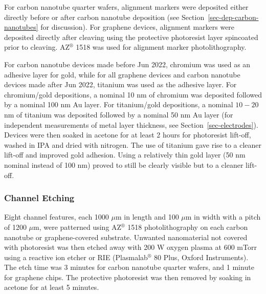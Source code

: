 \documentclass[
  letterpaper,
  DIV=11,
  numbers=noendperiod]{scrartcl}
\begin{document}
For carbon nanotube quarter wafers, alignment markers were deposited
either directly before or after carbon nanotube deposition (see
Section~\ref{sec-dep-carbon-nanotubes} for discussion). For graphene
devices, alignment markers were deposited directly after cleaving using
the protective photoresist layer spincoated prior to cleaving.
AZ\(^\circledR\) 1518 was used for alignment marker photolithography.

For carbon nanotube devices made before Jun 2022, chromium was used as
an adhesive layer for gold, while for all graphene devices and carbon
nanotube devices made after Jun 2022, titanium was used as the adhesive
layer. For chromium/gold depositions, a nominal 10 nm of chromium was
deposited followed by a nominal 100 nm Au layer. For titanium/gold
depositions, a nominal \(10-20\) nm of titanium was deposited followed
by a nominal 50 nm Au layer (for independent measurements of metal layer
thickness, see Section~\ref{sec-electrodes}). Devices were then soaked
in acetone for at least 2 hours for photoresist lift-off, washed in IPA
and dried with nitrogen. The use of titanium gave rise to a cleaner
lift-off and improved gold adhesion. Using a relatively thin gold layer
(50 nm nominal instead of 100 nm) proved to still be clearly visible but
to a cleaner lift-off.

\hypertarget{channel-etching}{%
\subsubsection{Channel Etching}\label{channel-etching}}

Eight channel features, each 1000 \(\mu\)m in length and 100 \(\mu\)m in
width with a pitch of 1200 \(\mu\)m, were patterned using
AZ\(^\circledR\) 1518 photolithography on each carbon nanotube or
graphene-covered substrate. Unwanted nanomaterial not covered with
photoresist was then etched away with 200 W oxygen plasma at 600 mTorr
using a reactive ion etcher or RIE (Plasmalab\(^\circledR\) 80 Plus,
Oxford Instruments). The etch time was 3 minutes for carbon nanotube
quarter wafers, and 1 minute for graphene chips. The protective
photoresist was then removed by soaking in acetone for at least 5
minutes.
\end{document}
